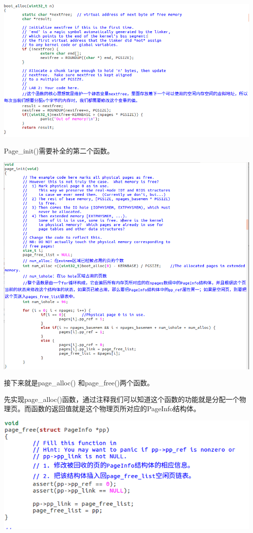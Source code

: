 \begin{ExerciseList}
  \includegraphics[width=6in]{figures/lab2/image41.png}

  Page\_init()需要补全的第二个函数。

  \includegraphics[width=6in]{figures/lab2/image42.png}

  接下来就是page\_alloc() 和page\_free()两个函数。

  先实现page\_alloc()函数，通过注释我们可以知道这个函数的功能就是分配一个物理页。而函数的返回值就是这个物理页所对应的PageInfo结构体。

  \includegraphics[width=6in]{figures/lab2/image44.png}


\end{ExerciseList}
